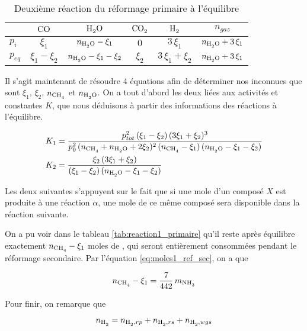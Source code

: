 \documentclass[a4paper, oneside, 12pt]{article}
\begin{document}
\begin{table}
	\centering
	\begin{tabular}{l|c|c|c|c|c}
		 & $\ce{CO}$ & $\ce{H2O}$ & $\ce{CO2}$ & $\ce{H2}$ & $n_{gaz}$ \\
		\hline
		$p_{i}$ & $\xi_1$ & $n_{\ce{H2O}} - \xi_1$ & $0$ & $3 \, \xi_1$ &
		$n_{\ce{H2O}} + 3 \, \xi_1$ \\
		$p_{eq}$ & $\xi_1 - \xi_2$ & $n_{\ce{H2O}} - \xi_1 - \xi_2$ & 
		$\xi_2$ & $3 \, \xi_1 + \xi_2$ & $n_{\ce{H2O}} + 3 \, \xi_1 $\\
	\end{tabular}
	\caption{Deuxième réaction du réformage primaire à l'équilibre}
	\label{tab:reaction2_primaire}
\end{table}

Il s'agit maintenant de résoudre 4 équations afin de déterminer nos inconnues que 
sont $\xi_1$, $\xi_2$, $n_{\ce{CH4}}$ et $n_{\ce{H2O}}$. 
On a tout d'abord les deux liées aux activités et constantes $K$, que nous déduisons
à partir des informations des réactions à l'équilibre.

\begin{align}
	K_1 &= \frac{p_{tot}^2 \, (\xi_1 - \xi_2) \, (3 \xi_1 + \xi_2)^3}
	{p_{0}^2 \, (n_{\ce{CH4}} + n_{\ce{H2O}} + 2 \xi_2)^2 \, (n_{\ce{CH4}} - 
	\xi_1) \, (n_{\ce{H2O}} - \xi_1 - \xi_2 )} 
	\label{eq:systeme1} \\
	K_2 &= \frac{\xi_2 \, (3 \xi_1 + \xi_2)}
	{(\xi_1 - \xi_2) \, (n_{\ce{H2O}} - \xi_1 - \xi_2)}
	\label{eq:systeme2}
\end{align}

Les deux suivantes s'appuyent sur le fait que si une mole d'un composé $X$ est
produite à une réaction $\alpha$, une mole de ce même composé sera disponible 
dans la réaction suivante.

On a pu voir dans le tableau \ref{tab:reaction1_primaire} qu'il reste après 
équilibre exactement $n_{\ce{CH4}} - \xi_1$ moles de , qui seront 
entièrement consommées pendant le réformage secondaire. 
Par l'équation \ref{eq:moles1_ref_sec}, on a que 

\begin{equation}
	n_{\ce{CH4}} - \xi_1 = \frac{7}{442} \, m_{\ce{NH3}}
	\label{eq:systeme3}
\end{equation}

Pour finir, on remarque que 

\begin{equation*}
	n_{\ce{H2}} = n_{\ce{H2}, rp} + n_{\ce{H2}, rs} + n_{\ce{H2}, wgs}
\end{equation*}
\end{document}
